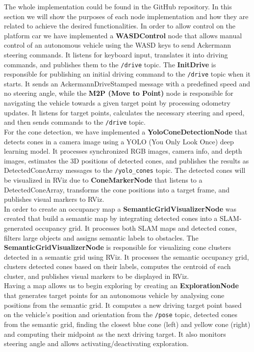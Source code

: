 The whole implementation could be found in the GitHub repository. In this section we will show the purposes of each node implementation and how they are related to achieve the desired functionalities.
In order to allow control on the platform car we have implemented a \textbf{WASDControl} node that allows manual control of an autonomous vehicle using the WASD keys to send Ackermann steering commands. It listens for keyboard input, translates it into driving commands, and publishes them to the \texttt{/drive} topic.
The \textbf{InitDrive} is responsible for publishing an initial driving command to the \texttt{/drive} topic when it starts. It sends an AckermannDriveStamped message with a predefined speed and no steering angle, while the \textbf{M2P (Move to Point)} node is responsible for navigating the vehicle towards a given target point by processing odometry updates. It listens for target points, calculates the necessary steering and speed, and then sends commands to the \texttt{/drive} topic.\\
\newline
For the cone detection, we have implemented a \textbf{YoloConeDetectionNode} that detects cones in a camera image using a YOLO (You Only Look Once) deep learning model. It processes synchronized RGB images, camera info, and depth images, estimates the 3D positions of detected cones, and publishes the results as DetectedConeArray messages to the \texttt{/yolo\_cones} topic.
The detected cones will be visualized in RViz due to \textbf{ConeMarkerNode} that listens to a DetectedConeArray, transforms the cone positions into a target frame, and publishes visual markers to RViz.\\
\newline
In order to create an occupancy map a \textbf{SemanticGridVisualizerNode} was created that build a semantic map by integrating detected cones into a SLAM-generated occupancy grid. It processes both SLAM maps and detected cones, filters large objects and assigns semantic labels to obstacles.
The \textbf{SemanticGridVisualizerNode} is responsible for visualizing cone clusters detected in a semantic grid using RViz. It processes the semantic occupancy grid, clusters detected cones based on their labels, computes the centroid of each cluster, and publishes visual markers to be displayed in RViz.\\
\newline
Having a map allows us to begin exploring by creating an \textbf{ExplorationNode} that generates target points for an autonomous vehicle by analysing cone positions from the semantic grid. It computes a new driving target point based on the vehicle's position and orientation from the \texttt{/pose} topic, detected cones from the semantic grid, finding the closest blue cone (left) and yellow cone (right) and computing their midpoint as the next driving target. It also monitors steering angle and allows activating/deactivating exploration.
